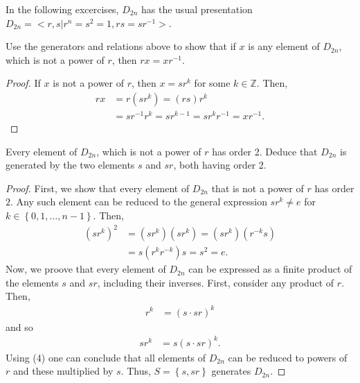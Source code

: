 \documentclass[12pt]{article}
\newcommand{\Z}{\mathbb{Z}}
\newenvironment{problem}[2][Problem]{\begin{trivlist} \item[\hskip \labelsep {\bfseries #1}\hskip \labelsep {\bfseries #2.}]}{\end{trivlist}}
\begin{document}
In the following excercises, $D_{2n}$ has the usual presentation $D_{2n}=<r,s|r^{n}=s^{2}=1,rs=sr^{-1}>$.
\begin{problem}{2}
  Use the generators and relations above to show that if $x$ is any element of $D_{2n}$, which is not a power of $r$, then $rx = xr^{-1}$.
\begin{proof}
  If $x$ is not a power of $r$, then $x=sr^{k}$ for some $k\in\Z$. Then, 
\begin{align*}
  rx &= r\left( sr^{k} \right) = \left( rs \right)r^{k}\\
  &= sr^{-1}r^{k} = sr^{k-1} = sr^{k}r^{-1} = xr^{-1}.
\end{align*}
\end{proof}
\end{problem}
\begin{problem}{3}
  Every element of $D_{2n}$, which is not a power of $r$ has order 2. Deduce that $D_{2n}$ is generated by the two elements $s$ and $sr$, both having order 2. 
\begin{proof}
  First, we show that every element of $D_{2n}$ that is not a power of $r$ has order $2$. Any such element can be reduced to the general expression $sr^{k}\neq e$ for $k\in\left\{ 0,1,\dots,n-1 \right\}$. Then, 
\begin{align*}
  (sr^{k})^{2} &= (sr^{k})(sr^{k}) = (sr^{k})(r^{-k}s)\\
  &= s(r^{k}r^{-k})s = s^{2} = e.
\end{align*}
Now, we proove that every element of $D_{2n}$ can be expressed as a finite product of the elements $s$ and $sr$, including their inverses. First, consider any product of $r$. Then, 
\begin{align*}
  r^{k} &= (s\cdot sr)^{k}
\end{align*}
and so
\begin{align*}
  sr^{k} &= s(s\cdot sr)^{k}.
\end{align*}
Using (4) one can conclude that all elements of $D_{2n}$ can be reduced to powers of $r$ and these multiplied by $s$. Thus, $S=\left\{ s,sr \right\}$ generates $D_{2n}$.
\end{proof}
\end{problem}
\end{document}
